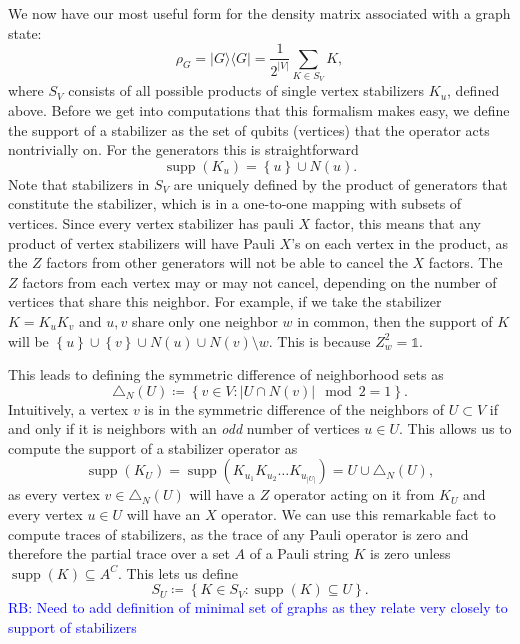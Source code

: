\documentclass{article}
\newcommand{\rb}[1]{{\textcolor{blue}{RB: #1}}}
\newcommand{\ketbra}[2]{| #1\rangle\! \langle #2|}
\newcommand{\set}[1]{\left\{ #1 \right\}}
\newcommand{\identity}{\mathds{1}}
\DeclareMathOperator{\supp}{supp}
\begin{document}
We now have our most useful form for the density matrix associated with a graph state:
\begin{equation}
    \rho_G = \ketbra{G}{G} = \frac{1}{2^{|V|}} \sum_{K \in S_V} K,
\end{equation}
where $S_V$ consists of all possible products of single vertex stabilizers $K_u$, defined above. Before we get into computations that this formalism makes easy, we define the support of a stabilizer as the set of qubits (vertices) that the operator acts nontrivially on. For the generators this is straightforward
\begin{equation}
    \supp(K_u) = \set{u} \cup N(u).
\end{equation}
Note that stabilizers in $S_V$ are uniquely defined by the product of generators that constitute the stabilizer, which is in a one-to-one mapping with subsets of vertices. Since every vertex stabilizer has pauli $X$ factor, this means that any product of vertex stabilizers will have Pauli $X$'s on each vertex in the product, as the $Z$ factors from other generators will not be able to cancel the $X$ factors. The $Z$ factors from each vertex may or may not cancel, depending on the number of vertices that share this neighbor. For example, if we take the stabilizer $K = K_u K_v$ and $u, v$ share only one neighbor $w$ in common, then the support of $K$ will be $\set{u} \cup \set{v} \cup N(u) \cup N(v) \setminus w$. This is because $Z_w^2 = \identity$. 

This leads to defining the symmetric difference of neighborhood sets as 
\begin{equation}
    \triangle_N(U) \coloneqq \set{v \in V : | U \cap N(v) | \mod 2 = 1}.
\end{equation}
Intuitively, a vertex $v$ is in the symmetric difference of the neighbors of $U \subset V$ if and only if it is neighbors with an \emph{odd} number of vertices $u \in U$. This allows us to compute the support of a stabilizer operator as
\begin{equation}
    \supp(K_U) = \supp(K_{u_1} K_{u_2} \ldots K_{u_{|U|}}) = U \cup \triangle_N(U),
\end{equation}
as every vertex $v \in \triangle_N(U)$ will have a $Z$ operator acting on it from $K_U$ and every vertex $u \in U$ will have an $X$ operator. We can use this remarkable fact to compute traces of stabilizers, as the trace of any Pauli operator is zero and therefore the partial trace over a set $A$ of a Pauli string $K$ is zero unless $\supp(K) \subseteq A^C$. This lets us define
\begin{equation}
    S_U \coloneqq \set{K \in S_V : \supp(K) \subseteq U }.
\end{equation}
\rb{Need to add definition of minimal set of graphs as they relate very closely to support of stabilizers}
\end{document}
